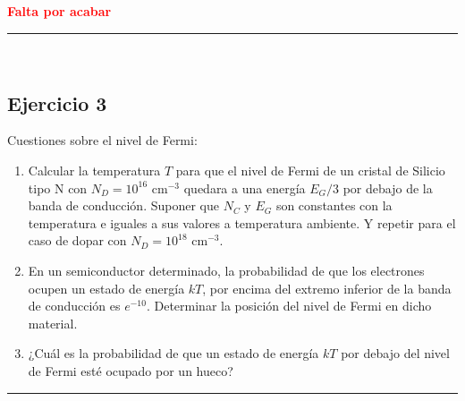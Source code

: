 \begin{Anotacion}
    \textcolor{red}{\textbf{Falta por acabar}}
\end{Anotacion}

\rule{\textwidth}{0.1pt} \\[2pt]

\subsection{Ejercicio 3}

	Cuestiones sobre el nivel de Fermi:

	\begin{enumerate}[label=\alph*)]
		\item Calcular la temperatura \( T \) para que el nivel de Fermi de un cristal de Silicio tipo N con \( N_D = 10^{16} \) cm\(^{-3}\) quedara a una energía \( E_G/3 \) por debajo de la banda de conducción. Suponer que \( N_C \) y \( E_G \) son constantes con la temperatura e iguales a sus valores a temperatura ambiente. Y repetir para el caso de dopar con \( N_D = 10^{18} \) cm\(^{-3}\).

		\item En un semiconductor determinado, la probabilidad de que los electrones ocupen un estado de energía \( kT \), por encima del extremo inferior de la banda de conducción es \( e^{-10} \). Determinar la posición del nivel de Fermi en dicho material.

		\item ¿Cuál es la probabilidad de que un estado de energía \( kT \) por debajo del nivel de Fermi esté ocupado por un hueco?
	\end{enumerate}

\rule{\textwidth}{0.1pt} \\[2pt]


